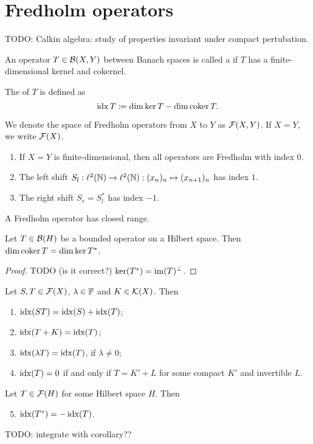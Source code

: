 \section{Fredholm operators}
TODO: Calkin algebra: study of properties invariant under compact pertubation.
\begin{definition}
An operator $T\in\operatorname{\mathcal{B}}(X,Y)$ between Banach spaces is called a  if $T$ has a finite-dimensional kernel and cokernel.

The  of $T$ is defined as
\[ \operatorname{idx} T \coloneqq \dim\ker T - \dim\operatorname{coker} T.  \]

We denote the space of Fredholm operators from $X$ to $Y$ as $\operatorname{\mathcal{F}}(X,Y)$. If $X=Y$, we write $\operatorname{\mathcal{F}}(X)$.
\end{definition}

\begin{example}
\begin{enumerate}
\item If $X=Y$ is finite-dimensional, then all operators are Fredholm with index $0$.
\item The left shift $S_l:\ell^2(\mathbb{N})\to\ell^2(\mathbb{N}): (x_n)_n\mapsto (x_{n+1})_n$ has index $1$.
\item The right shift $S_r = S_l^*$ has index $-1$.
\end{enumerate}
\end{example}

\begin{lemma}
A Fredholm operator has closed range.
\end{lemma}

\begin{lemma}
Let $T\in\operatorname{\mathcal{B}}(H)$ be a bounded operator on a Hilbert space. Then $\dim\operatorname{coker} T = \dim\ker T^*$.
\end{lemma}
\begin{proof}
TODO (is it correct?) $\ker(T^*) = \operatorname{im}(T)^\perp$.
\end{proof}


\begin{proposition}
Let $S,T\in\operatorname{\mathcal{F}}(X)$, $\lambda\in\mathbb{F}$ and $K\in\operatorname{\mathcal{K}}(X)$. Then
\begin{enumerate}
\item $\operatorname{idx}(ST) = \operatorname{idx}(S)+\operatorname{idx}(T)$;
\item $\operatorname{idx}(T+K) = \operatorname{idx}(T)$;
\item $\operatorname{idx}(\lambda T) = \operatorname{idx}(T)$, if $\lambda \neq 0$;
\item $\operatorname{idx}(T) = 0$ \textup{if and only if} $T=K'+L$ for some compact $K'$ and invertible $L$.
\end{enumerate}
Let $T\in\operatorname{\mathcal{F}}(H)$ for some Hilbert space $H$. Then
\begin{enumerate} \setcounter{enumi}{4}
\item $\operatorname{idx}(T^*) = -\operatorname{idx}(T)$.
\end{enumerate}
\end{proposition}
TODO: integrate with corollary??

